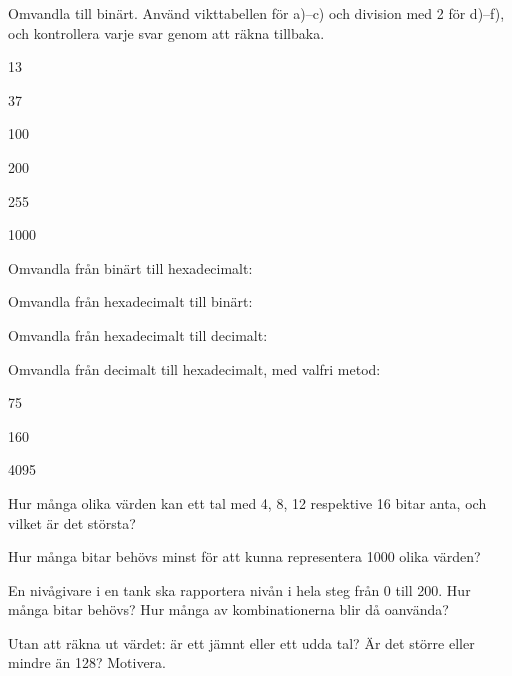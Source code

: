 \label{c1:ex:3}
Omvandla till binärt. Använd vikttabellen för a)--c) och division med 2 för d)--f), och
kontrollera varje svar genom att räkna tillbaka.
\begin{parts}
  \item 13
  \item 37
  \item 100
  \item 200
  \item 255
  \item 1000
\end{parts}

\label{c1:ex:4}
Omvandla från binärt till hexadecimalt:
\begin{parts}
  \item {}
  \item {}
  \item {}
  \item {}
\end{parts}
Omvandla från hexadecimalt till binärt:
\begin{parts}[start=5]
  \item {}
  \item {}
  \item {}
\end{parts}

\label{c1:ex:5}
Omvandla från hexadecimalt till decimalt:
\begin{parts}
  \item {}
  \item {}
  \item {}
  \item {}
\end{parts}
Omvandla från decimalt till hexadecimalt, med valfri metod:
\begin{parts}[start=5]
  \item 75
  \item 160
  \item 4095
\end{parts}

\label{c1:ex:6}
\begin{parts}
  \item Hur många olika värden kan ett tal med 4, 8, 12 respektive 16 bitar anta, och vilket är det
    största?
  \item Hur många bitar behövs minst för att kunna representera 1000 olika värden?
  \item En nivågivare i en tank ska rapportera nivån i hela steg från 0 till 200. Hur många bitar
    behövs? Hur många av kombinationerna blir då oanvända?
  \item Utan att räkna ut värdet: är  ett jämnt eller ett udda tal? Är det större
    eller mindre än 128? Motivera.
\end{parts}

